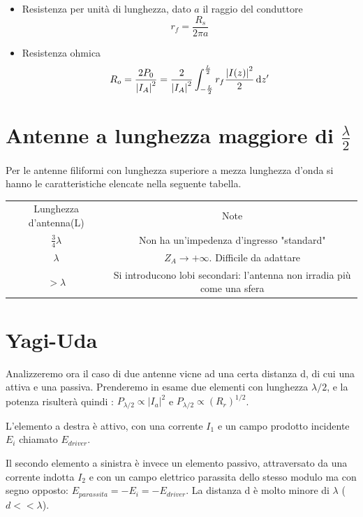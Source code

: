 \begin{itemize}
	\item Resistenza per unità di lunghezza, dato $a$ il raggio del conduttore
	\begin{equation}
		r_f = \frac{R_s}{2\pi a}
	\end{equation}

	\item Resistenza ohmica
	\begin{equation}
		R_o
		= \frac{2 P_0}{\left |I_A \right |^{2}}
		= \frac{2}{\left |I_A \right |^{2}} \int_{-\frac{L}{2}}^{\frac{L}{2}} r_f \frac{\left |I(z) \right |^{2}}{2} \mathop{}\!\mathrm{d} z^\prime
	\end{equation}
\end{itemize}

\section{Antenne a lunghezza maggiore di $\frac{\lambda}{2}$}
Per le antenne filiformi con lunghezza superiore a mezza lunghezza d'onda si hanno le caratteristiche elencate nella seguente tabella.
\begin{table}[hb!]
\centering
\begin{tabular}{cc}
Lunghezza d'antenna(L) & Note\\
$\frac{3}{4}\lambda$			& Non ha un'impedenza d'ingresso "standard"\\
$\lambda$									& $Z_A \to +\infty$. Difficile da adattare \\
$>\lambda$								& \parbox{7cm}{Si introducono lobi secondari: l'antenna non irradia più come una sfera}
\end{tabular}
\end{table}

\section{Yagi-Uda}
Analizzeremo ora il caso di due antenne vicne ad una certa distanza d, di cui una attiva e una passiva.
Prenderemo in esame due elementi con lunghezza $\lambda/2$, e la potenza risulterà quindi : $P_{\lambda/2}\propto \left | I_a \right |^2$ e $P_{\lambda/2}\propto (R_r)^{1/2}$.

L'elemento a destra è attivo, con una corrente $I_1$ e un campo prodotto incidente	$E_i$ chiamato $E_{driver}$.

Il secondo elemento a sinistra è invece un elemento passivo, attraversato da una corrente indotta $I_2$ e con un campo elettrico parassita dello stesso modulo ma con segno opposto: $E_{parassita} = -E_i = -E_{driver}$.
La distanza d è molto minore di $\lambda$ ($d<<\lambda$).

